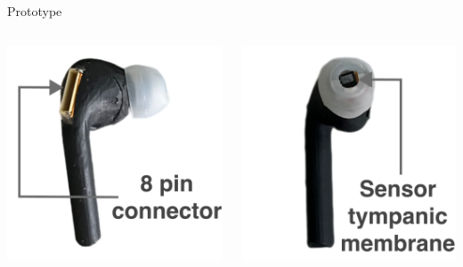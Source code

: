 \documentclass[en]{sdqbeamer}
\begin{document}
\begin{frame}{Prototype}
  \begin{columns}[T] %
    \begin{column}{.31\textwidth} %
      \includegraphics[width=0.9\linewidth]{../thesis-doc/images/prototype/Earpod_Side1_visual_markers.pdf} %
    \end{column}
    
    \begin{column}{.31\textwidth} %
      \includegraphics[width=0.9\linewidth]{../thesis-doc/images/prototype/Earpod_Front_visual_markers.pdf} %
    \end{column}


\end{columns}
\end{frame}
\end{document}
